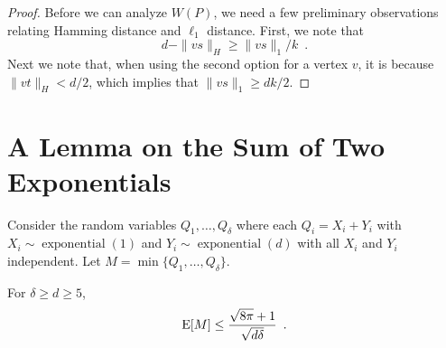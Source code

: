 \documentclass[lotsofwhite]{patmorin}
\DeclareMathOperator{\exponential}{exponential}
\begin{document}
\begin{proof}
Before we can analyze
$W(P)$, we need a few preliminary observations relating Hamming distance and $\ell_1$ distance.  First, we note that
\begin{equation}
   d-\|vs\|_H \ge \|vs\|_1/k \enspace .
\end{equation}
Next we note that, when using the second option for a vertex $v$, it is because $\|vt\|_H < d/2$, which implies that $\|vs\|_1 \ge dk/2$.
\end{proof}

\section{A Lemma on the Sum of Two Exponentials}

Consider the random variables $Q_1,\ldots,Q_\delta$ where each
$Q_i=X_i+Y_i$ with $X_i\sim\exponential(1)$ and $Y_i\sim\exponential(d)$
with all $X_i$ and $Y_i$ independent.  Let $M=\min\{Q_1,\ldots,Q_\delta\}$.

\begin{lem}
   For $\delta\ge d \ge 5$, 
   \[  \mathrm{E}[M] \le \frac{\sqrt{8\pi} + 1}{\sqrt{d\delta}} \enspace . \]
\end{lem}
\end{document}
